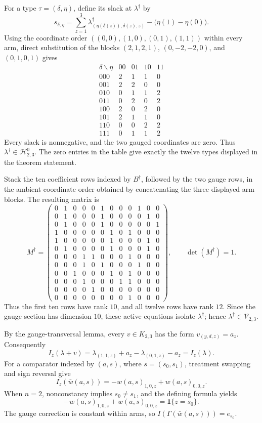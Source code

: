 For a type \(\tau=(\delta,\eta)\), define its slack at \(\lambda^\dagger\) by
\[
s_{\delta,\eta}=\sum_{z=1}^{3}\lambda^\dagger_{(\eta(\delta(z)),\delta(z),z)}-\bigl(\eta(1)-\eta(0)\bigr).
\]
Using the coordinate order \(((0,0),(1,0),(0,1),(1,1))\) within every arm, direct substitution of the blocks \((2,1,2,1)\), \((0,-2,-2,0)\), and \((0,1,0,1)\) gives
\[
\begin{array}{c|rrrr}
\delta\backslash\eta&00&01&10&11\\ \hline
000&2&1&1&0\\
001&2&2&0&0\\
010&0&1&1&2\\
011&0&2&0&2\\
100&2&0&2&0\\
101&2&1&1&0\\
110&0&0&2&2\\
111&0&1&1&2
\end{array}
\]
Every slack is nonnegative, and the two gauged coordinates are zero. Thus \(\lambda^\dagger\in\mathcal H^0_{2,3}\). The zero entries in the table give exactly the twelve types displayed in the theorem statement.

Stack the ten coefficient rows indexed by \(B^\dagger\), followed by the two gauge rows, in the ambient coordinate order obtained by concatenating the three displayed arm blocks. The resulting matrix is
\[
M^\dagger=\begin{pmatrix}
0&1&0&0&0&1&0&0&0&1&0&0\\
0&1&0&0&0&1&0&0&0&0&1&0\\
0&1&0&0&0&1&0&0&0&0&0&1\\
1&0&0&0&0&0&1&0&1&0&0&0\\
1&0&0&0&0&0&1&0&0&0&1&0\\
0&1&0&0&0&0&1&0&0&0&1&0\\
0&0&0&1&1&0&0&0&1&0&0&0\\
0&0&0&1&0&1&0&0&0&1&0&0\\
0&0&1&0&0&0&1&0&1&0&0&0\\
0&0&0&1&0&0&0&1&1&0&0&0\\
0&0&0&0&1&0&0&0&0&0&0&0\\
0&0&0&0&0&0&0&0&1&0&0&0
\end{pmatrix},\qquad \det(M^\dagger)=1.
\]
Thus the first ten rows have rank \(10\), and all twelve rows have rank \(12\). Since the gauge section has dimension \(10\), these active equations isolate \(\lambda^\dagger\); hence \(\lambda^\dagger\in\mathcal V_{2,3}\).

By the gauge-transversal lemma, every \(v\in K_{2,3}\) has the form \(v_{(y,d,z)}=a_z\). Consequently
\[
I_z(\lambda+v)=\lambda_{(1,1,z)}+a_z-\lambda_{(0,1,z)}-a_z=I_z(\lambda).
\]
For a comparator indexed by \((a,s)\), where \(s=(s_0,s_1)\), treatment swapping and sign reversal give
\[
I_z(\bar w(a,s))=-w(a,s)_{1,0,z}+w(a,s)_{0,0,z}.
\]
When \(n=2\), nonconstancy implies \(s_0\ne s_1\), and the defining formula yields
\[
-w(a,s)_{1,0,z}+w(a,s)_{0,0,z}=\mathbf 1\{z=s_0\}.
\]
The gauge correction is constant within arms, so \(I(\Gamma(\bar w(a,s)))=e_{s_0}\).

